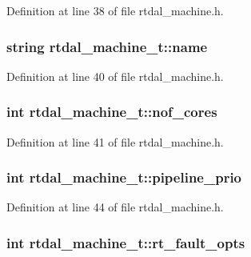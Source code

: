 Definition at line 38 of file rtdal\-\_\-machine.\-h.

\subsubsection[{name}]{\setlength{\rightskip}{0pt plus 5cm}string rtdal\-\_\-machine\-\_\-t\-::name}\label{structrtdal__machine__t_a13c3d54f7150506a281019950397e605}


Definition at line 40 of file rtdal\-\_\-machine.\-h.

\subsubsection[{nof\-\_\-cores}]{\setlength{\rightskip}{0pt plus 5cm}int rtdal\-\_\-machine\-\_\-t\-::nof\-\_\-cores}\label{structrtdal__machine__t_aac3563adebb6d638b13bc8ec653ee745}


Definition at line 41 of file rtdal\-\_\-machine.\-h.

\subsubsection[{pipeline\-\_\-prio}]{\setlength{\rightskip}{0pt plus 5cm}int rtdal\-\_\-machine\-\_\-t\-::pipeline\-\_\-prio}\label{structrtdal__machine__t_a8e553a91b8b34808eb8f20332fdc1189}


Definition at line 44 of file rtdal\-\_\-machine.\-h.

\subsubsection[{rt\-\_\-fault\-\_\-opts}]{\setlength{\rightskip}{0pt plus 5cm}int rtdal\-\_\-machine\-\_\-t\-::rt\-\_\-fault\-\_\-opts}\label{structrtdal__machine__t_a9b0cff836cea88c3b44359d928412737}


